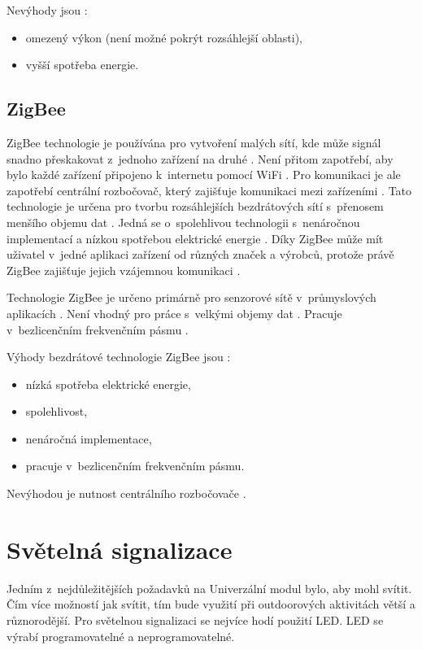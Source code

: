 Nevýhody jsou \cite{Bezdrat_muni}:
\begin{itemize}
  \item omezený výkon (není možné pokrýt rozsáhlejší oblasti), 
  \item vyšší spotřeba energie.
\end{itemize}

\subsection{ZigBee}
ZigBee technologie je používána pro vytvoření malých sítí, kde může signál snadno přeskakovat z~jednoho zařízení na druhé \cite{ZigBee_smart}.
Není přitom zapotřebí, aby bylo každé zařízení připojeno k~internetu pomocí WiFi \cite{ZigBee_smart}. Pro komunikaci je ale zapotřebí centrální 
rozbočovač, který zajišťuje komunikaci mezi zařízeními \cite{ZigBee_smart}. Tato technologie je určena pro tvorbu rozsáhlejších bezdrátových sítí
s~přenosem menšího objemu dat \cite{ZigBee_smart}. Jedná se o~spolehlivou technologii s~nenáročnou implementací a nízkou spotřebou elektrické energie 
\cite{ZigBee_smart}. Díky ZigBee může mít uživatel v~jedné aplikaci zařízení 
od různých značek a výrobců, protože právě ZigBee zajišťuje jejich vzájemnou komunikaci \cite{ZigBee_smart}.

Technologie ZigBee je určeno primárně pro senzorové sítě v~průmyslových aplikacích \cite{Bezdrat_muni}. Není vhodný pro práce s~velkými objemy dat \cite{Bezdrat_muni}.
Pracuje v~bezlicenčním frekvenčním pásmu \cite{Bezdrat_muni}.

Výhody bezdrátové technologie ZigBee jsou \cite{ZigBee_smart}:
\begin{itemize}
  \item nízká spotřeba elektrické energie,
  \item spolehlivost, 
  \item nenáročná implementace,
  \item pracuje v~bezlicenčním frekvenčním pásmu. 
\end{itemize}

Nevýhodou je nutnost centrálního rozbočovače \cite{ZigBee_smart}.

\section{Světelná signalizace}
Jedním z~nejdůležitějších požadavků na Univerzální modul bylo, aby mohl svítit. Čím více možností jak svítit, tím bude využití při 
outdoorových aktivitách větší a různorodější. Pro světelnou signalizaci se nejvíce hodí použití LED. LED se výrabí programovatelné a neprogramovatelné. 

